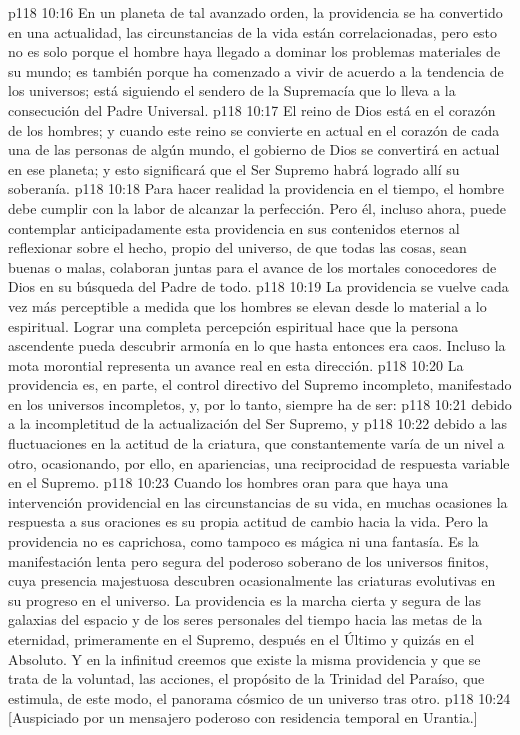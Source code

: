 \vs p118 10:16 \pc En un planeta de tal avanzado orden, la providencia se ha convertido en una actualidad, las circunstancias de la vida están correlacionadas, pero esto no es solo porque el hombre haya llegado a dominar los problemas materiales de su mundo; es también porque ha comenzado a vivir de acuerdo a la tendencia de los universos; está siguiendo el sendero de la Supremacía que lo lleva a la consecución del Padre Universal.
\vs p118 10:17 \pc El reino de Dios está en el corazón de los hombres; y cuando este reino se convierte en actual en el corazón de cada una de las personas de algún mundo, el gobierno de Dios se convertirá en actual en ese planeta; y esto significará que el Ser Supremo habrá logrado allí su soberanía.
\vs p118 10:18 Para hacer realidad la providencia en el tiempo, el hombre debe cumplir con la labor de alcanzar la perfección. Pero él, incluso ahora, puede contemplar anticipadamente esta providencia en sus contenidos eternos al reflexionar sobre el hecho, propio del universo, de que todas las cosas, sean buenas o malas, colaboran juntas para el avance de los mortales conocedores de Dios en su búsqueda del Padre de todo.
\vs p118 10:19 \pc La providencia se vuelve cada vez más perceptible a medida que los hombres se elevan desde lo material a lo espiritual. Lograr una completa percepción espiritual hace que la persona ascendente pueda descubrir armonía en lo que hasta entonces era caos. Incluso la mota morontial representa un avance real en esta dirección.
\vs p118 10:20 La providencia es, en parte, el control directivo del Supremo incompleto, manifestado en los universos incompletos, y, por lo tanto, siempre ha de ser:
\vs p118 10:21  debido a la incompletitud de la actualización del Ser Supremo, y
\vs p118 10:22  debido a las fluctuaciones en la actitud de la criatura, que constantemente varía de un nivel a otro, ocasionando, por ello, en apariencias, una reciprocidad de respuesta variable en el Supremo.
\vs p118 10:23 \pc Cuando los hombres oran para que haya una intervención providencial en las circunstancias de su vida, en muchas ocasiones la respuesta a sus oraciones es su propia actitud de cambio hacia la vida. Pero la providencia no es caprichosa, como tampoco es mágica ni una fantasía. Es la manifestación lenta pero segura del poderoso soberano de los universos finitos, cuya presencia majestuosa descubren ocasionalmente las criaturas evolutivas en su progreso en el universo. La providencia es la marcha cierta y segura de las galaxias del espacio y de los seres personales del tiempo hacia las metas de la eternidad, primeramente en el Supremo, después en el Último y quizás en el Absoluto. Y en la infinitud creemos que existe la misma providencia y que se trata de la voluntad, las acciones, el propósito de la Trinidad del Paraíso, que estimula, de este modo, el panorama cósmico de un universo tras otro.
\vsetoff
\vs p118 10:24 [Auspiciado por un mensajero poderoso con residencia temporal en Urantia.]
